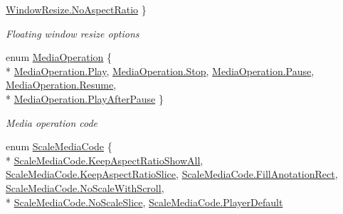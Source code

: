 \begin{DoxyCompactItemize}
\hyperlink{namespace_pdf_file_writer_ad205ccc8e28ac3421bff44c8f010ccf4a6a90ff9773a4ac8e96f226feb9bb1558}{Window\+Resize.\+No\+Aspect\+Ratio}
 \}\begin{DoxyCompactList}\small\item\em Floating window resize options \end{DoxyCompactList}
\item 
enum \hyperlink{namespace_pdf_file_writer_a584857a04ad87432dfae4edfe22a8dce}{Media\+Operation} \{ \\*
\hyperlink{namespace_pdf_file_writer_a584857a04ad87432dfae4edfe22a8dceade3c731be5633838089a07179d301d7b}{Media\+Operation.\+Play}, 
\hyperlink{namespace_pdf_file_writer_a584857a04ad87432dfae4edfe22a8dcea11a755d598c0c417f9a36758c3da7481}{Media\+Operation.\+Stop}, 
\hyperlink{namespace_pdf_file_writer_a584857a04ad87432dfae4edfe22a8dcea105b296a83f9c105355403f3332af50f}{Media\+Operation.\+Pause}, 
\hyperlink{namespace_pdf_file_writer_a584857a04ad87432dfae4edfe22a8dceaf1cefec9e2196c672a622347f1fbc325}{Media\+Operation.\+Resume}, 
\\*
\hyperlink{namespace_pdf_file_writer_a584857a04ad87432dfae4edfe22a8dceaa59a8ad55417d56d443a36c0934cec5f}{Media\+Operation.\+Play\+After\+Pause}
 \}\begin{DoxyCompactList}\small\item\em Media operation code \end{DoxyCompactList}
\item 
enum \hyperlink{namespace_pdf_file_writer_a4f8011b57966a21a365eeaa2469a5dab}{Scale\+Media\+Code} \{ \\*
\hyperlink{namespace_pdf_file_writer_a4f8011b57966a21a365eeaa2469a5dabae4e8f0f3f9b5e10631b837159d646895}{Scale\+Media\+Code.\+Keep\+Aspect\+Ratio\+Show\+All}, 
\hyperlink{namespace_pdf_file_writer_a4f8011b57966a21a365eeaa2469a5dabaf108eba8ac2e747b6206c089c9c522a7}{Scale\+Media\+Code.\+Keep\+Aspect\+Ratio\+Slice}, 
\hyperlink{namespace_pdf_file_writer_a4f8011b57966a21a365eeaa2469a5daba3e3cf42cff77d053dc34cf78c7af57d1}{Scale\+Media\+Code.\+Fill\+Anotation\+Rect}, 
\hyperlink{namespace_pdf_file_writer_a4f8011b57966a21a365eeaa2469a5daba7f2020287fc938f887bdeaceea89952a}{Scale\+Media\+Code.\+No\+Scale\+With\+Scroll}, 
\\*
\hyperlink{namespace_pdf_file_writer_a4f8011b57966a21a365eeaa2469a5daba959edabd2566b339ff10dbe8e755cd35}{Scale\+Media\+Code.\+No\+Scale\+Slice}, 
\hyperlink{namespace_pdf_file_writer_a4f8011b57966a21a365eeaa2469a5daba4c948dba5ba37bc7bbd6d7ab3d39d8ef}{Scale\+Media\+Code.\+Player\+Default}

\end{DoxyCompactItemize}

